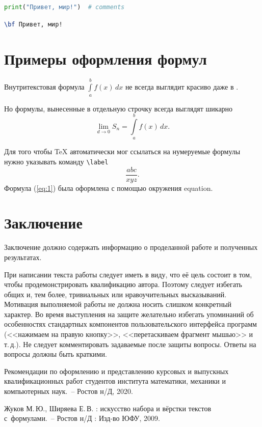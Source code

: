 \documentclass[14pt]{mmcs_article}
\begin{document}
\begin{lstlisting}[language=Python, caption={Python, пример кода}, label=stud-lst:2]
print("Привет, мир!")  # comments
\end{lstlisting}

\begin{lstlisting}[language=TeX, caption=\LaTeX, label=stud-lst:3]
% параметр language в наших листингах только для себя
\bf Привет, мир!
\end{lstlisting}



\newpage
\section{Примеры оформления формул}

Внутритекстовая формула
$ \int\limits_a^b f(x)\,dx$ не всегда выглядит красиво даже в \LaTeXe.

Но формулы, вынесенные в отдельную строчку всегда выглядят шикарно
\[
  \lim_{d\to 0} S_n =
  \int\limits_a^b f(x)\,dx.
\]

Для того чтобы {\TeX} автоматически мог ссылаться на нумеруемые формулы нужно указывать команду \verb"\label"
\begin{equation}\label{eq:1}
  \frac{abc}{xyz}.
\end{equation}
Формула (\ref{eq:1}) была оформлена с помощью окружения \textsf{equation}.

\newpage
{}
\section*{Заключение}

Заключение должно содержать информацию о проделанной работе и полученных результатах.

При написании текста работы следует иметь в виду, что её цель состоит в том, чтобы продемонстрировать квалификацию автора. Поэтому следует избегать общих и, тем более, тривиальных или нравоучительных высказываний. Мотивация выполняемой работы не должна носить слишком конкретный характер. Во время выступления на защите желательно избегать упоминаний об особенностях стандартных компонентов пользовательского интерфейса программ (<<нажимаем на правую кнопку>>, <<перетаскиваем фрагмент мышью>> и т.\,д.). Не следует комментировать задаваемые после защиты вопросы. Ответы на вопросы должны быть краткими.



\newpage

\renewcommand{\refname}{\centering \textbf{Литература}}

\begin{thebibliography}{0}
  Рекомендации по оформлению
  и представлению курсовых
  и выпускных квалификационных работ
  студентов института математики,
  механики и компьютерных наук.~--
  Ростов н/Д, 2020.

  Жуков М.\,Ю., Ширяева Е.\,В.
  \LaTeXe: искусство набора и вёрстки текстов с~формулами.~-- Ростов н/Д : Изд-во ЮФУ, 2009.
\end{thebibliography}
\end{document}
